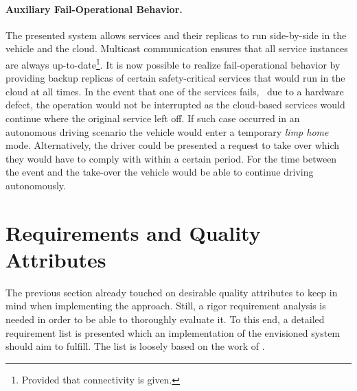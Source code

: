 \paragraph{Auxiliary Fail-Operational Behavior.}
The presented system allows services and their replicas to run side-by-side in the vehicle and the cloud. Multicast communication ensures that all service instances are always up-to-date\footnote{Provided that connectivity is given.}. It is now possible to realize fail-operational behavior by providing backup replicas of certain safety-critical services that would run in the cloud at all times. In the event that one of the services fails, \eg\ due to a hardware defect, the operation would not be interrupted as the cloud-based services would continue where the original service left off. If such case occurred in an autonomous driving scenario the vehicle would enter a temporary \emph{limp home} mode. Alternatively, the driver could be presented a request to take over which they would have to comply with within a certain period. For the time between the event and the take-over the vehicle would be able to continue driving autonomously.

%
%
%
%
%
%
%
%
%
%

\section{Requirements and Quality Attributes} \label{sec:requirements}
The previous section already touched on desirable quality attributes to keep in mind when implementing the approach. Still, a rigor requirement analysis is needed in order to be able to thoroughly evaluate it. To this end, a detailed requirement list is presented which an implementation of the envisioned system should aim to fulfill. The list is loosely based on the work of \citeauthor*{o2007quality} \cite{o2007quality}.


